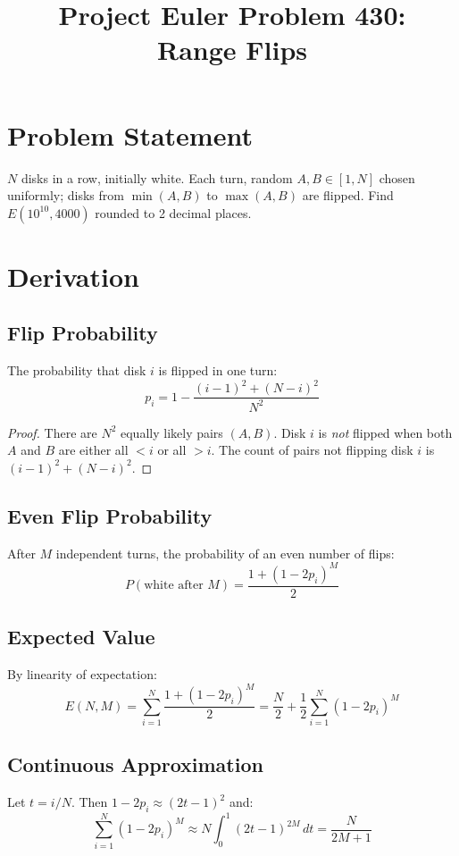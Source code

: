 \documentclass[12pt]{article}
\title{Project Euler Problem 430:\\Range Flips}
\author{}
\date{}
\begin{document}
\maketitle

\section{Problem Statement}
$N$ disks in a row, initially white. Each turn, random $A,B \in [1,N]$ chosen uniformly; disks from $\min(A,B)$ to $\max(A,B)$ are flipped. Find $E(10^{10}, 4000)$ rounded to 2 decimal places.

\section{Derivation}

\subsection{Flip Probability}
The probability that disk $i$ is flipped in one turn:
\[
p_i = 1 - \frac{(i-1)^2 + (N-i)^2}{N^2}
\]

\begin{proof}
There are $N^2$ equally likely pairs $(A,B)$. Disk $i$ is \emph{not} flipped when both $A$ and $B$ are either all $< i$ or all $> i$. The count of pairs not flipping disk $i$ is $(i-1)^2 + (N-i)^2$.
\end{proof}

\subsection{Even Flip Probability}
After $M$ independent turns, the probability of an even number of flips:
\[
P(\text{white after } M) = \frac{1 + (1-2p_i)^M}{2}
\]

\subsection{Expected Value}
By linearity of expectation:
\[
E(N,M) = \sum_{i=1}^{N} \frac{1 + (1-2p_i)^M}{2} = \frac{N}{2} + \frac{1}{2}\sum_{i=1}^{N} (1-2p_i)^M
\]

\subsection{Continuous Approximation}
Let $t = i/N$. Then $1 - 2p_i \approx (2t-1)^2$ and:
\[
\sum_{i=1}^{N} (1-2p_i)^M \approx N \int_0^1 (2t-1)^{2M}\,dt = \frac{N}{2M+1}
\]
\end{document}
